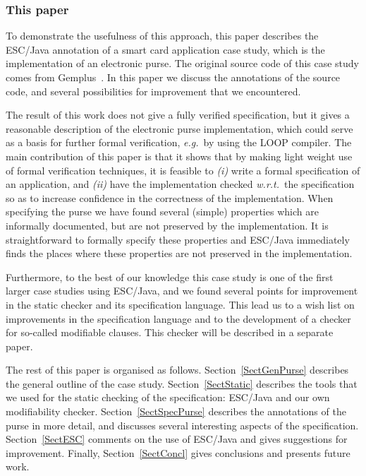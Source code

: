 \documentclass[a4paper]{llncs}
\begin{document}
\subsubsection{This paper}
To demonstrate the usefulness of this approach, this paper describes
the ESC/Java annotation of a smart card application case study, which
is the implementation of an electronic purse. The original source code
of this case study comes from Gemplus~\cite{PurseUrl}. In this
paper we discuss the annotations of the source code, and several
possibilities for improvement that we encountered.

The result of this work does not give a fully verified specification,
but it gives a reasonable description of the electronic purse
implementation, which could serve as a basis for further formal
verification, \emph{e.g.}~by using the LOOP compiler.  The main
contribution of this paper is that it shows that by making light
weight use of formal verification techniques, it is feasible to
\emph{(i)} write a formal specification of an application, and
\emph{(ii)} have the implementation checked \emph{w.r.t.}~the 
specification so as to increase confidence in the correctness of the
implementation. When specifying the purse we have found several
(simple) properties which are informally documented, but are not
preserved by the implementation. It is straightforward to formally
specify these properties and ESC/Java immediately finds the places
where these properties are not preserved in the implementation.

Furthermore, to the best of our knowledge this case study is one of
the first larger case studies using ESC/Java, and we found
several points for improvement in the static checker and its
specification language. This lead us to a wish list on improvements in
the specification language and to the development of a checker for
so-called modifiable clauses. This checker will be described in a
separate paper.%

The rest of this paper is organised as
follows. Section~\ref{SectGenPurse} describes the general outline of
the case study. Section~\ref{SectStatic} describes the tools that we
used for the static checking of the specification: ESC/Java and our
own modifiability checker. Section~\ref{SectSpecPurse} describes the
annotations of the purse in more detail, and discusses several
interesting aspects of the specification. Section~\ref{SectESC}
comments on the use of ESC/Java and gives suggestions for
improvement. Finally, Section~\ref{SectConcl} gives conclusions and
presents future work.
\end{document}

